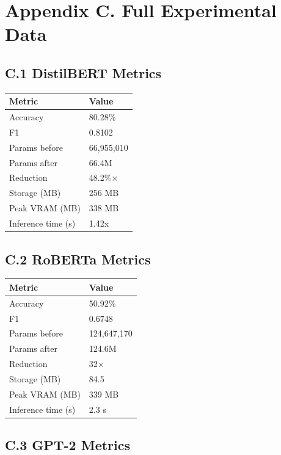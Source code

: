 
\section{Appendix C. Full Experimental Data}

\subsection{C.1 DistilBERT Metrics}

\begin{table}[H]
\centering
\small
\begin{tabular}{ll}
\toprule
\textbf{Metric} & \textbf{Value} \\
\midrule
Accuracy & 80.28\% \\
F1 & 0.8102 \\
Params before & 66,955,010 \\
Params after & 66.4M \\
Reduction & 48.2\%$\times$ \\
Storage (MB) & 256 MB \\
Peak VRAM (MB) & 338 MB \\
Inference time (s) & 1.42x \\
\bottomrule
\end{tabular}
\end{table}

\subsection{C.2 RoBERTa Metrics}

\begin{table}[H]
\centering
\small
\begin{tabular}{ll}
\toprule
\textbf{Metric} & \textbf{Value} \\
\midrule
Accuracy & 50.92\% \\
F1 & 0.6748 \\
Params before & 124,647,170 \\
Params after & 124.6M \\
Reduction & 32$\times$ \\
Storage (MB) & 84.5 \\
Peak VRAM (MB) & 339 MB \\
Inference time (s) & 2.3 s \\
\bottomrule
\end{tabular}
\end{table}

\subsection{C.3 GPT-2 Metrics}

